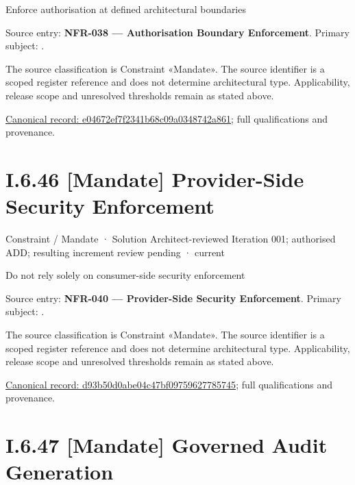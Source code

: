Enforce authorisation at defined architectural boundaries



Source entry: \textbf{NFR-038 — Authorisation Boundary Enforcement}. Primary subject: \texttt{}.



The source classification is Constraint «Mandate». The source identifier is a scoped register reference and does not determine architectural type. Applicability, release scope and unresolved thresholds remain as stated above.


{\footnotesize \href{../../../../../../../continuum/motivation/constraint/mandate/e04672ef7f2341b68c09a0348742a861.md}{Canonical record: e04672ef7f2341b68c09a0348742a861}; full qualifications and provenance.}\par
\section*{I.6.46 [Mandate] Provider-Side Security Enforcement}
\label{navigation:I.6.46}

\label{element:d93b50d0abe04c47bf09759627785745}
{\small Constraint / Mandate · Solution Architect-reviewed Iteration 001; authorised ADD; resulting increment review pending · current}\par

Do not rely solely on consumer-side security enforcement



Source entry: \textbf{NFR-040 — Provider-Side Security Enforcement}. Primary subject: \texttt{}.



The source classification is Constraint «Mandate». The source identifier is a scoped register reference and does not determine architectural type. Applicability, release scope and unresolved thresholds remain as stated above.


{\footnotesize \href{../../../../../../../continuum/motivation/constraint/mandate/d93b50d0abe04c47bf09759627785745.md}{Canonical record: d93b50d0abe04c47bf09759627785745}; full qualifications and provenance.}\par
\section*{I.6.47 [Mandate] Governed Audit Generation}
\label{navigation:I.6.47}

